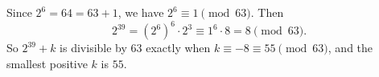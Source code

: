 Since $2^6=64=63+1$, we have $2^6\equiv1\pmod{63}$. Then
\[
2^{39}=\left(2^6\right)^6\cdot2^3\equiv1^6\cdot8=8\pmod{63}.
\]
So $2^{39}+k$ is divisible by $63$ exactly when $k\equiv-8\equiv55\pmod{63}$, and the smallest positive $k$ is $\boxed{55}$.
